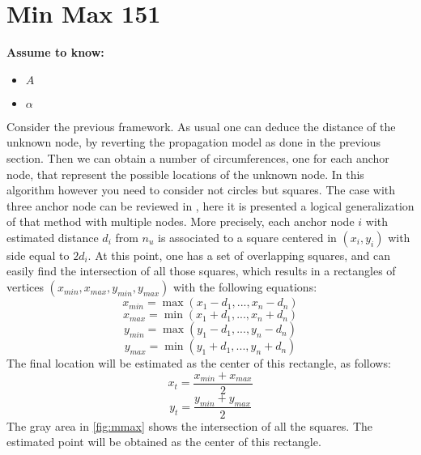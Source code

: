 \documentclass[12pt,twoside]{report}
\begin{document}
\section{Min Max 151}
  \begin{center}
  \textbf{Assume to know:}
  \begin{itemize}
    \centering
    \item $A$
    \item $\alpha$
  \end{itemize}
  \end{center}
Consider the previous framework. As usual one can deduce the distance of the unknown node, by reverting the propagation model as done in the previous section. Then we can obtain a number of circumferences, one for each anchor node, that represent the possible locations of the unknown node. In this algorithm however you need to consider not circles but squares. The case with three anchor node can be reviewed in \cite{inproceedings}, here it is presented a logical generalization of that method with multiple nodes. More precisely, each anchor node $i$ with estimated distance $d_i$ from $n_u$ is associated to a square centered in $(x_i,y_i)$ with side equal to $2d_i$. At this point, one has a set of overlapping squares, and can easily find the intersection of all those squares,  which results in a rectangles of vertices $(x_{min},x_{max},y_{min},y_{max})$ with the following equations:
\begin{equation}
    x_{min}=\max(x_1-d_1,...,x_n-d_n)
\end{equation}
\begin{equation}
    x_{max}=\min(x_1+d_1,...,x_n+d_n)
\end{equation}
\begin{equation}
    y_{min}=\max(y_1-d_1,...,y_n-d_n)
\end{equation}
\begin{equation}
    y_{max}=\min(y_1+d_1,...,y_n+d_n)
\end{equation}
The final location will be estimated as the center of this rectangle, as follows:
\begin{equation}
    x_t=\frac{x_{min}+x_{max}}{2}
\end{equation}
\begin{equation}
    y_t=\frac{y_{min}+y_{max}}{2}
\end{equation}
The gray area in \ref{fig:mmax} shows the intersection of all the squares. The estimated point will be obtained as the center of this rectangle.
\end{document}
